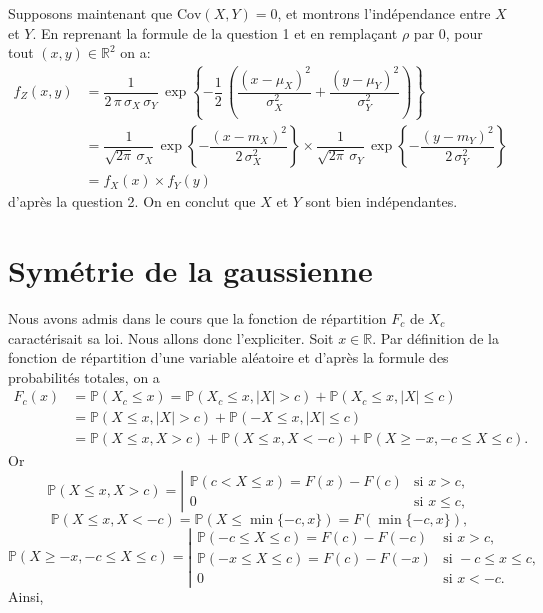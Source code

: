 Supposons maintenant que \(\text{Cov}\left(X,Y\right) = 0\), et montrons
l'indépendance entre \(X\) et \(Y\). En reprenant la formule de la
question 1 et en remplaçant \(\rho\) par \(0\), pour tout
\((x,y) \in \mathbb{R}^2\) on a: \begin{align*}
f_Z(x,y) &= \dfrac{1}{2\,\pi\,\sigma_X\,\sigma_Y}\,\exp\left\{ -\dfrac{1}{2}\,\left( \dfrac{(x-\mu_X)^2}{\sigma_X^2} + \dfrac{(y-\mu_Y)^2}{\sigma_Y^2} \right) \right\}\\
&= \dfrac{1}{\sqrt{2\pi}\,\sigma_X}\,\exp\left\{ -\dfrac{(x-m_X)^2}{2\,\sigma_X^2} \right\} \times \dfrac{1}{\sqrt{2\pi}\,\sigma_Y}\,\exp\left\{ -\dfrac{(y-m_Y)^2}{2\,\sigma_Y^2} \right\}\\
&= f_X(x)\times f_Y(y)
\end{align*} d'après la question 2. On en conclut que \(X\) et \(Y\)
sont bien indépendantes.

\section{Symétrie de la
gaussienne}\label{II-symuxe9trie-de-la-gaussienne-1}

\label{II-answer-gausssym-loi}
Nous avons admis dans le cours que la fonction de répartition \(F_c\) de
\(X_c\) caractérisait sa loi. Nous allons donc l'expliciter. Soit
\(x \in \mathbb{R}\). Par définition de la fonction de répartition d'une
variable aléatoire et d'après la formule des probabilités totales, on a
\begin{align*}
F_c(x) &= \mathbb{P}\left(X_c \leq x\right) = \mathbb{P}\left( X_c \leq x, |X| > c \right) + \mathbb{P}\left( X_c \leq x, |X| \leq c\right)\\
&= \mathbb{P}\left( X\leq x, |X| > c \right) + \mathbb{P}\left(-X \leq x, |X| \leq c\right)\\
&= \mathbb{P}\left( X\leq x, X > c \right) + \mathbb{P}\left(X \leq x, X < -c \right) + \mathbb{P}\left( X \geq -x, -c \leq X \leq c\right).
\end{align*} Or
\[\mathbb{P}\left( X\leq x, X > c \right) = \left|\begin{array}{ll} \mathbb{P}\left(c < X \leq x \right) = F(x) - F(c) & \text{si } x > c,\\ 0 & \text{si } x\leq c,\end{array}\right.\]
\[ \mathbb{P}\left(X \leq x, X < -c \right) = \mathbb{P}\left( X \leq \min\{-c,x\} \right) = F\left(\min\{-c,x\}\right), \]
\[ \mathbb{P}\left( X \geq -x, -c \leq X \leq c\right) = \left|\begin{array}{ll} \mathbb{P}\left(-c \leq X \leq c \right) = F(c) - F(-c) & \text{si } x > c, \\ \mathbb{P}\left(-x \leq X \leq c \right) = F(c) - F(-x) & \text{si } -c \leq x \leq c,\\ 0 & \text{si } x<-c. \end{array}\right.\]
Ainsi,

